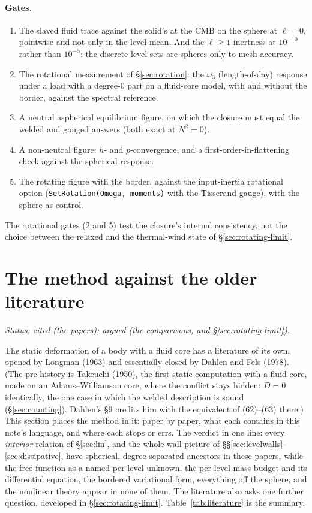 \documentclass[11pt]{article}
\theoremstyle{definition}
\theoremstyle{remark}
\newcommand{\code}[1]{\texttt{#1}}
\begin{document}
\paragraph{Gates.}
\begin{enumerate}
\item The slaved fluid trace against the solid's at the CMB on the
  sphere at $\ell = 0$, pointwise and not only in the level mean. And
  the $\ell \ge 1$ inertness at $10^{-10}$ rather than $10^{-5}$: the
  discrete level sets are spheres only to mesh accuracy.
\item The rotational measurement of \S\ref{sec:rotation}: the
  $\omega_3$ (length-of-day) response under a load with a degree-0
  part on a fluid-core model, with and without the border, against the
  spectral reference.
\item A neutral aspherical equilibrium figure, on which the closure
  must equal the welded and gauged answers (both exact at $N^2 = 0$).
\item A non-neutral figure: $h$- and $p$-convergence, and a
  first-order-in-flattening check against the spherical response.
\item The rotating figure with the border, against the input-inertia
  rotational option (\code{SetRotation(Omega, moments)} with the
  Tisserand gauge), with the sphere as control.
\end{enumerate}
The rotational gates (2 and 5) test the closure's internal consistency,
not the choice between the relaxed and the thermal-wind state of
\S\ref{sec:rotating-limit}.

\section{The method against the older literature}
\label{sec:literature}

\emph{Status: cited (the papers); argued (the comparisons, and
\S\ref{sec:rotating-limit}).}

The static deformation of a body with a fluid core has a literature of
its own, opened by Longman (1963) and essentially closed by Dahlen and
Fels (1978). (The pre-history is Takeuchi (1950), the first static
computation with a fluid core, made on an Adams--Williamson core,
where the conflict stays hidden: $D = 0$ identically, the one case in
which the welded description is sound (\S\ref{sec:counting}). Dahlen's
\S9 credits him with the equivalent of (62)--(63) there.) This section
places the method in it: paper by paper,
what each contains in this note's language, and where each stops or
errs. The verdict in one line: every \emph{interior} relation of
\S\ref{sec:lin}, and the whole wall picture of
\S\S\ref{sec:levelwalls}--\ref{sec:dissipative},
have spherical, degree-separated ancestors in these papers, while the
free function as a named per-level unknown, the per-level mass budget
and its differential equation, the bordered variational form,
everything off the sphere, and the nonlinear theory appear in none of
them. The literature also asks one further question,
developed in \S\ref{sec:rotating-limit}.
Table~\ref{tab:literature} is the summary.
\end{document}

